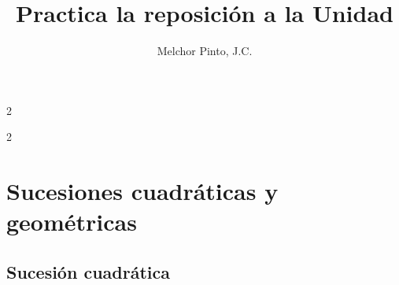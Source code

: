 \documentclass[12pt,addpoints]{repaso}
\title{Practica la reposición a la Unidad}
\author{Melchor Pinto, J.C.}
\begin{document}
\INFO
\begin{multicols}{2}
	\tableofcontents
\end{multicols}
\vfill
\begin{multicols}{2}
    
    \vspace*{2\baselineskip}
    
    
\end{multicols}
\section{Sucesiones cuadráticas y geométricas}
\subsection{Sucesión cuadrática}
\end{document}
